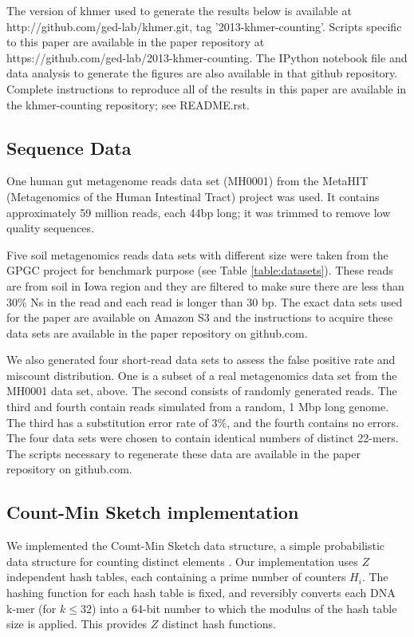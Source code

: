 
The version of khmer used to generate the results below is available
at http://github.com/ged-lab/khmer.git, tag '2013-khmer-counting'.
Scripts specific to this paper are available in the paper repository
at \\
https://github.com/ged-lab/2013-khmer-counting.
The IPython\cite{4160251} notebook file and data analysis to generate the figures are also
available in that github repository.  Complete instructions to reproduce
all of the results in this paper are available in the khmer-counting
repository; see README.rst.

\subsection{Sequence Data}

One human gut metagenome reads data set (MH0001) from the 
MetaHIT (Metagenomics of the Human Intestinal Tract) project \cite{Qin2010} was used. 
It contains approximately 59 million reads, each 44bp long; it was trimmed to remove 
low quality sequences. 

Five soil metagenomics reads data sets with different size were taken
from the GPGC project for benchmark purpose (see Table
\ref{table:datasets}).  These reads are from soil in Iowa region and they
are filtered to make sure there are less than 30\% Ns in the read and
each read is longer than 30 bp.  The exact data sets used for the
paper are available on Amazon S3 and the instructions to acquire these
data sets are available in the paper repository on github.com.

We also generated four short-read data sets to assess the false
positive rate and miscount distribution. One is a subset of a real
metagenomics data set from the MH0001 data set, above. The second
consists of randomly generated reads. The third and fourth contain
reads simulated from a random, 1 Mbp long genome.  The third has a
substitution error rate of 3\%, and the fourth contains no errors. The
four data sets were chosen to contain identical numbers of distinct
22-mers.  The scripts necessary to regenerate these data are available
in the paper repository on github.com.

\subsection{Count-Min Sketch implementation}

We implemented the Count-Min Sketch data structure, a simple
probabilistic data structure for counting distinct elements
\cite{Cormode2005}.  Our implementation uses $Z$ independent hash
tables, each containing a prime number of counters $H_i$.  The hashing
function for each hash table is fixed, and reversibly converts each
DNA k-mer (for $k \le 32$) into a 64-bit number to which the modulus of
the hash table size is applied.  This provides $Z$ distinct hash
functions.

